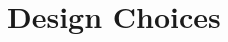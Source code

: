 \documentclass{beamer}
\newcommand{\highlight}[1]{\textcolor{myorange}{\textbf{#1}}}
\newcommand{\bad}[1]{\textcolor{myred}{\textbf{#1}}}
\begin{document}
\section{Design Choices}

%
%
%
%
%
%
\end{document}
